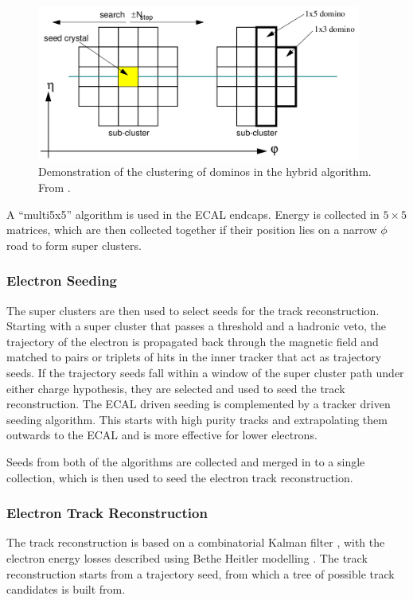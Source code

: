 \begin{figure}[htbp]
  \centering
  \includegraphics[width=0.95\textwidth]{hybridalgo}
  \caption{Demonstration of the clustering of dominos in the hybrid algorithm.
           From \cite{eECAL}.}
  \label{fig:hybrid}
\end{figure}

A ``multi5x5'' algorithm is used in the ECAL endcaps. Energy is collected in
$5\times5$ matrices, which are then collected together if their position lies on
a narrow $\phi$ road to form super clusters.

\subsubsection{Electron Seeding}
The super clusters are then used to select seeds for the track reconstruction.
Starting with a super cluster that passes a \pt threshold and a hadronic veto,
the trajectory of the electron is propagated back through the magnetic field and
matched to pairs or triplets of hits in the inner tracker that act as trajectory
seeds.  If the trajectory seeds fall within a window of the super cluster path
under either charge hypothesis, they are selected and used to seed the track
reconstruction.  The ECAL driven seeding is complemented by a tracker driven
seeding algorithm.  This starts with high purity tracks and extrapolating them
outwards to the ECAL and is more effective for lower \pt electrons.

Seeds from both of the algorithms are collected and merged in to a single
collection, which is then used to seed the electron track reconstruction.

\subsubsection{Electron Track Reconstruction}
The track reconstruction is based on a combinatorial Kalman filter \cite{kalman},
with the electron energy losses described using Bethe Heitler
modelling \cite{bethe}.
The track reconstruction starts from a trajectory seed, from which a tree of
possible track candidates is built from. 

